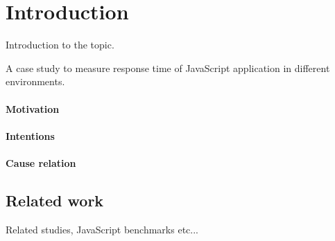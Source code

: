 \chapter{Introduction\label{intro}}

Introduction to the topic.

A case study to measure response time of JavaScript application in different environments. 

\subsubsection{Motivation}

\subsubsection{Intentions}

\subsubsection{Cause relation}


\section{Related work}
Related studies, JavaScript benchmarks etc...